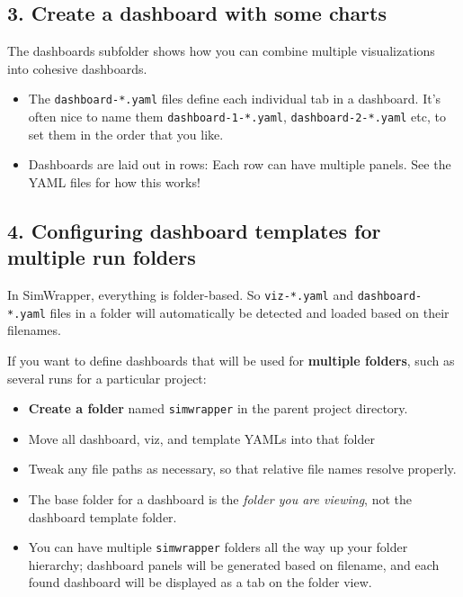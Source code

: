 \hypertarget{create-a-dashboard-with-some-charts}{%
\subsection{3. Create a dashboard with some
charts}\label{create-a-dashboard-with-some-charts}}

The dashboards subfolder shows how you can combine multiple
visualizations into cohesive dashboards.

\begin{itemize}
\tightlist
\item
  The \texttt{dashboard-*.yaml} files define each individual tab in a
  dashboard. It's often nice to name them \texttt{dashboard-1-*.yaml},
  \texttt{dashboard-2-*.yaml} etc, to set them in the order that you
  like.
\item
  Dashboards are laid out in rows: Each row can have multiple panels.
  See the YAML files for how this works!
\end{itemize}

\hypertarget{configuring-dashboard-templates-for-multiple-run-folders}{%
\subsection{4. Configuring dashboard templates for multiple run
folders}\label{configuring-dashboard-templates-for-multiple-run-folders}}

In SimWrapper, everything is folder-based. So \texttt{viz-*.yaml} and
\texttt{dashboard-*.yaml} files in a folder will automatically be
detected and loaded based on their filenames.

If you want to define dashboards that will be used for \textbf{multiple
folders}, such as several runs for a particular project:

\begin{itemize}
\tightlist
\item
  \textbf{Create a folder} named \texttt{simwrapper} in the parent
  project directory.
\item
  Move all dashboard, viz, and template YAMLs into that folder
\item
  Tweak any file paths as necessary, so that relative file names resolve
  properly.
\item
  The base folder for a dashboard is the \emph{folder you are viewing},
  not the dashboard template folder.
\item
  You can have multiple \texttt{simwrapper} folders all the way up your
  folder hierarchy; dashboard panels will be generated based on
  filename, and each found dashboard will be displayed as a tab on the
  folder view.
\end{itemize}

